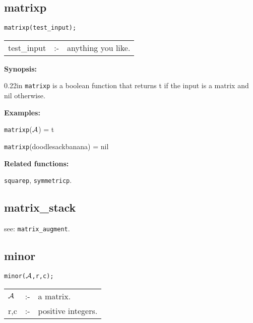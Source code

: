 \subsection{matrixp}


\hspace*{0.175in} {\tt matrixp(test\_input);}

\hspace*{0.1in}  
\begin{tabular}{l l l}
test\_input &:-& anything you like.
\end{tabular}

{\bf Synopsis:} %

\begin{addtolength}{\leftskip}{0.22in}
{\tt matrixp} is a boolean function that returns t if 
                the input is a matrix and nil otherwise.

\end{addtolength}

{\bf Examples:}

\hspace*{0.175in} {\tt matrixp}(${\cal A}$) = t 

\hspace*{0.175in} {\tt matrixp}(doodlesackbanana) = nil

{\bf Related functions:}

\hspace*{0.175in} {\tt squarep}, {\tt symmetricp}.


\subsection{matrix\_stack}

\hspace*{0.175in} see: {\tt matrix\_augment}.


\subsection{minor}


\hspace*{0.175in} {\tt minor(${\cal A}$,r,c);}

\hspace*{0.1in}  
\begin{tabular}{l l l} 
${\cal A}$ &:-& a matrix. \\
r,c        &:-& positive integers.
\end{tabular}

